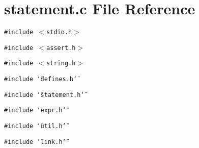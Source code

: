 \section{statement.c File Reference}
\label{statement_8c}
{\tt \#include $<$stdio.h$>$}\par
{\tt \#include $<$assert.h$>$}\par
{\tt \#include $<$string.h$>$}\par
{\tt \#include \char`\"{}defines.h\char`\"{}}\par
{\tt \#include \char`\"{}statement.h\char`\"{}}\par
{\tt \#include \char`\"{}expr.h\char`\"{}}\par
{\tt \#include \char`\"{}util.h\char`\"{}}\par
{\tt \#include \char`\"{}link.h\char`\"{}}\par
